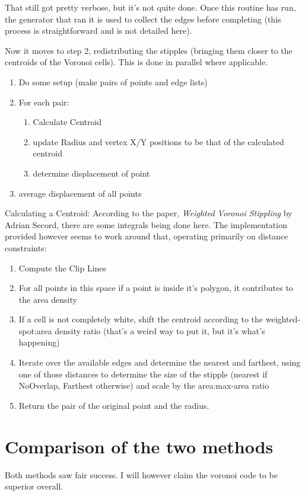 \documentclass[11pt]{article}
\begin{document}
That still got pretty verbose, but it's not quite done. Once this routine has run, the generator that ran it is used to collect the edges before completing (this process is straightforward and is not detailed here).

Now it moves to step 2, redistributing the stipples (bringing them closer to the centroids of the Voronoi cells). This is done in parallel where applicable.

\begin{enumerate}
\item Do some setup (make pairs of points and edge lists)
\item For each pair:
\begin{enumerate}
\item Calculate Centroid
\item update Radius and vertex X/Y positions to be that of the calculated centroid
\item determine displacement of point
\end{enumerate}
\item average displacement of all points
\end{enumerate}


Calculating a Centroid:
According to the paper, \textit{Weighted Voronoi Stippling} by Adrian Secord, there are some integrals being done here. The implementation provided however seems to work around that, operating primarily on distance constraints:

\begin{enumerate}
\item Compute the Clip Lines
\item For all points in this space if a point is inside it's polygon, it contributes to the area density
\item If a cell is not completely white, shift the centroid according to the weighted-spot:area density ratio (that's a weird way to put it, but it's what's happening)
\item Iterate over the available edges and determine the nearest and farthest, using one of those distances to determine the size of the stipple (nearest if NoOverlap, Farthest otherwise) and scale by the area:max-area ratio
\item Return the pair of the original point and the radius.
\end{enumerate}



\section{Comparison of the two methods}
Both methods saw fair success. I will however claim the voronoi code to be superior overall.
\end{document}
